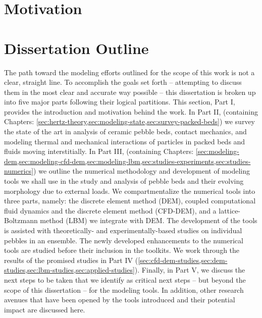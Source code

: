 \chapter{Motivation}\label{sec:motivation}




\chapter{Dissertation Outline}
The path toward the modeling efforts outlined for the scope of this work is not a clear, straight line. To accomplish the goals set forth -- attempting to discuss them in the most clear and accurate way possible -- this dissertation is broken up into five major parts following their logical partitions. This section, Part I, provides the introduction and motivation behind the work. In Part II, (containing Chapters: \cref{sec:hertz-theory,sec:modeling-state,sec:survey-packed-beds}) we survey the state of the art in analysis of ceramic pebble beds, contact mechanics, and modeling thermal and mechanical interactions of particles in packed beds and fluids moving interstitially.  In Part III, (containing Chapters: \cref{sec:modeling-dem,sec:modeling-cfd-dem,sec:modeling-lbm,sec:studies-experiments,sec:studies-numerics}) we outline the numerical methodology and development of modeling tools we shall use in the study and analysis of pebble beds and their evolving morphology due to external loads. We compartmentalize the numerical tools into three parts, namely: the discrete element method (DEM), coupled computational fluid dynamics and the discrete element method (CFD-DEM), and a lattice-Boltzmann method (LBM) we integrate with DEM. The development of the tools is assisted with theoretically- and experimentally-based studies on individual pebbles in an ensemble. The newly developed enhancements to the numerical tools are studied before their inclusion in the toolkits. We work through the results of the promised studies in Part IV (\cref{sec:cfd-dem-studies,sec:dem-studies,sec:lbm-studies,sec:applied-studies}). Finally, in Part V, we discuss the next steps to be taken that we identify as critical next steps -- but beyond the scope of this dissertation -- for the modeling tools. In addition, other research avenues that have been opened by the tools introduced and their potential impact are discussed here.